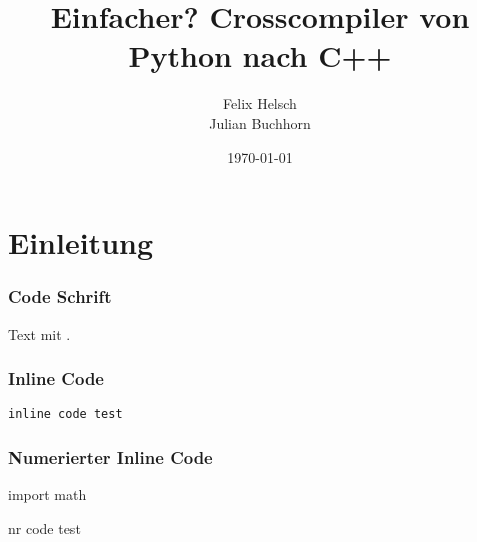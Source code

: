 


\title{ Einfacher? Crosscompiler von Python nach C++ }
\subject{Programmierpraktikum}
\author{Felix Helsch \\ Julian Buchhorn}
\date{\today}

\usepackage[version=3]{mhchem}
\usepackage{rotating}
\usepackage{booktabs}

\newcommand{\cc}[1]{\multicolumn{1}{c}{#1}} %
\newcommand{\C}[2]{\multicolumn{#1}{|c|}{#2}} %
\newcommand{\mc}[2]{\multicolumn{#1}{c}{#2}} %

                                       

\pagestyle{empty}
\maketitle
\tableofcontents

\clearpage 
\pagestyle{fancy}

\section{Einleitung}

\subsubsection*{Code Schrift}
Text mit   .

\subsubsection*{Inline Code}
\begin{lstlisting}
inline code test
\end{lstlisting}

\subsubsection*{Numerierter Inline Code}
\begin{nrcode}
import math

nr code test
\end{nrcode}




\appendix
\newpage


\clearpage
\listoffigures
\clearpage
\listoftables
\clearpage
\nocite{*}
\printbibliography


